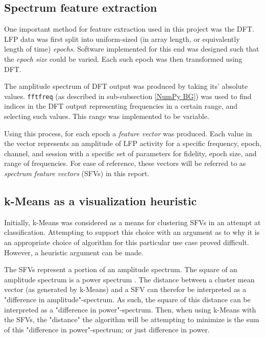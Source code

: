 \documentclass{article}
\begin{document}
\subsection{Spectrum feature extraction}\label{DFT Method}

One important method for feature extraction used in this project was the DFT. 
LFP data was first split into uniform-sized (in array length, or equivalently length of time) \textit{epochs}.
Software implemented for this end was designed such that the \textit{epoch size} could be varied.
Each such epoch was then transformed using DFT.

The amplitude spectrum of DFT output was produced by taking its' absolute values. 
\texttt{fftfreq} (as described in sub-subsection \ref{NumPy BG}) was used to find indices in the DFT output representing frequencies in a certain range, and selecting such values.
This range was implemented to be variable.

Using this process, for each epoch a \textit{feature vector} was produced. 
Each value in the vector represents an amplitude of LFP activity for a specific frequency, epoch, channel, and session with a specific set of parameters for fidelity, epoch size, and range of frequencies.
For ease of reference, these vectors will be referred to as \textit{spectrum feature vectors} (SFVs) in this report.

\subsection{k-Means as a visualization heuristic}\label{KM Method}

Initially, k-Means was considered as a means for clustering SFVs in an attempt at classification. 
Attempting to support this choice with an argument as to why it is an appropriate choice of algorithm for this particular use case proved difficult.
However, a heuristic argument can be made.

The SFVs represent a portion of an amplitude spectrum. 
The square of an amplitude spectrum is a power spectrum \citep{numpy}.
The distance between a cluster mean vector (as generated by k-Means) and a SFV can therefor be interpreted as a "difference in amplitude"-spectrum.
As such, the square of this distance can be interpreted as a "difference in power"-spectrum.
Then, when using k-Means with the SFVs, the "distance" the algorithm will be attempting to minimize is the sum of this "difference in power"-spectrum; or just difference in power.
\end{document}
